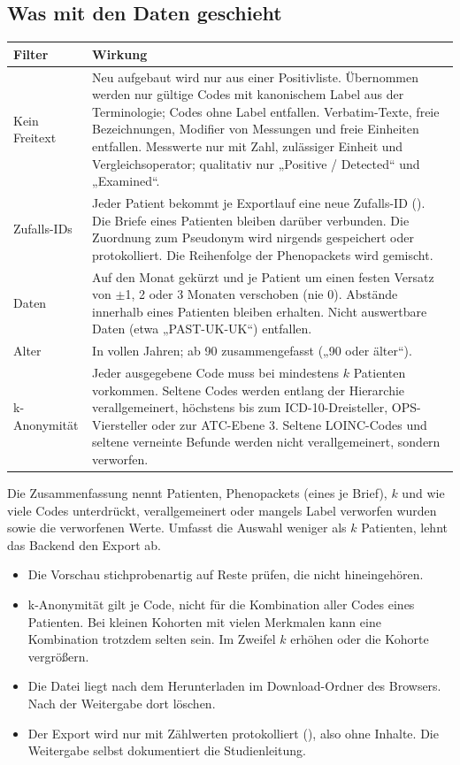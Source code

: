 \documentclass[11pt,a4paper,parskip=half-,headings=standardclasses,toc=bibliography,open=any]{scrreprt}
\begin{document}
\subsection*{Was mit den Daten geschieht}

\begin{tabularx}{\textwidth}{@{}P{3.6cm}L@{}}
\toprule
\textbf{Filter} & \textbf{Wirkung}\\
\midrule
Kein Freitext & Neu aufgebaut wird nur aus einer Positivliste. Übernommen werden nur gültige Codes mit kanonischem Label aus der Terminologie; Codes ohne Label entfallen. Verbatim-Texte, freie Bezeichnungen, Modifier von Messungen und freie Einheiten entfallen. Messwerte nur mit Zahl, zulässiger Einheit und Vergleichsoperator; qualitativ nur „Positive / Detected“ und „Examined“.\\
Zufalls-IDs & Jeder Patient bekommt je Exportlauf eine neue Zufalls-ID (). Die Briefe eines Patienten bleiben darüber verbunden. Die Zuordnung zum Pseudonym wird nirgends gespeichert oder protokolliert. Die Reihenfolge der Phenopackets wird gemischt.\\
Daten & Auf den Monat gekürzt und je Patient um einen festen Versatz von $\pm$1, 2 oder 3 Monaten verschoben (nie 0). Abstände innerhalb eines Patienten bleiben erhalten. Nicht auswertbare Daten (etwa „PAST-UK-UK“) entfallen.\\
Alter & In vollen Jahren; ab 90 zusammengefasst („90 oder älter“).\\
k-Anonymität & Jeder ausgegebene Code muss bei mindestens $k$ Patienten vorkommen. Seltene Codes werden entlang der Hierarchie verallgemeinert, höchstens bis zum ICD-10-Dreisteller, OPS-Viersteller oder zur ATC-Ebene 3. Seltene LOINC-Codes und seltene verneinte Befunde werden nicht verallgemeinert, sondern verworfen.\\
\bottomrule
\end{tabularx}

Die Zusammenfassung nennt Patienten, Phenopackets (eines je Brief), $k$ und wie viele Codes unterdrückt, verallgemeinert oder mangels Label verworfen wurden sowie die verworfenen Werte. Umfasst die Auswahl weniger als $k$ Patienten, lehnt das Backend den Export ab.

\begin{achtung}
\begin{itemize}
  \item Die Vorschau stichprobenartig auf Reste prüfen, die nicht hineingehören.
  \item k-Anonymität gilt je Code, nicht für die Kombination aller Codes eines Patienten. Bei kleinen Kohorten mit vielen Merkmalen kann eine Kombination trotzdem selten sein. Im Zweifel $k$ erhöhen oder die Kohorte vergrößern.
  \item Die Datei liegt nach dem Herunterladen im Download-Ordner des Browsers. Nach der Weitergabe dort löschen.
  \item Der Export wird nur mit Zählwerten protokolliert (), also ohne Inhalte. Die Weitergabe selbst dokumentiert die Studienleitung.
\end{itemize}
\end{achtung}
\end{document}
